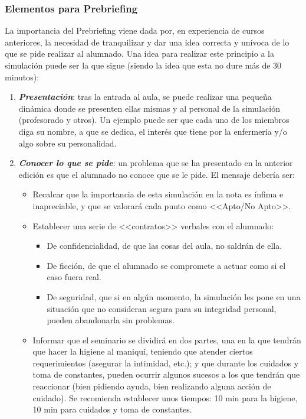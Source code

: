 \subsubsection{Elementos para Prebriefing}
La importancia del Prebriefing viene dada por, en experiencia de cursos anteriores, la necesidad de tranquilizar y dar una idea correcta y unívoca de lo que se pide realizar al alumnado. Una ídea para realizar este principio a la simulación puede ser la que sigue (siendo la idea que esta no dure más de 30 minutos):
\begin{enumerate}[topsep=0pt, partopsep=0pt,itemsep=0pt,parsep=0pt]
    \item \textbf{\textit{Presentación}}: tras la entrada al aula, se puede realizar una pequeña dinámica donde se presenten ellas mismas y al personal de la simulación (profesorado y otros). Un ejemplo puede ser que cada uno de los miembros diga su nombre, a que se dedica, el interés que tiene por la enfermería y/o algo sobre su personalidad.
    \item \textbf{\textit{Conocer lo que se pide}}: un problema que se ha presentado en la anterior edición es que el alumnado no conoce que se le pide. El mensaje debería ser:
    \begin{itemize}[topsep=0pt, partopsep=0pt,itemsep=0pt,parsep=0pt]
        \item Recalcar que la importancia de esta simulación en la nota es ínfima e inapreciable, y que se valorará cada punto como <<Apto/No Apto>>.
        \item Establecer una serie de <<contratos>> verbales con el alumnado:
        \begin{itemize}[topsep=0pt, partopsep=0pt,itemsep=0pt,parsep=0pt]
            \item De confidencialidad, de que las cosas del aula, no saldrán de ella.
            \item De ficción, de que el alumnado se compromete a actuar como si el caso fuera real.
            \item De seguridad, que si en algún momento, la simulación les pone en una situación que no consideran segura para su integridad personal, pueden abandonarla sin problemas.
        \end{itemize}
        \item Informar que el seminario se dividirá en dos partes, una en la que tendrán que hacer la higiene al maniquí, teniendo que atender ciertos requerimientos (asegurar la intimidad, etc.); y que durante los cuidados y toma de constantes, pueden ocurrir algunos sucesos a los que tendrán que reaccionar (bien pidiendo ayuda, bien realizando alguna acción de cuidado). Se recomienda establecer unos tiempos: 10 min para la higiene, 10 min para cuidados y toma de constantes.

\end{itemize}
\end{enumerate}
